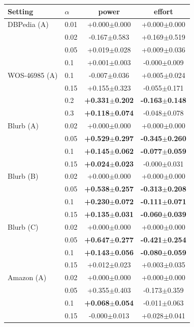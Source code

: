 \begin{tabular}{llcc}
\toprule
Setting & $\alpha$ & power & effort \\
\midrule
DBPedia (A) & 0.01 & +0.000$\pm$0.000 & +0.000$\pm$0.000 \\
 & 0.02 & -0.167$\pm$0.583 & +0.169$\pm$0.519 \\
 & 0.05 & +0.019$\pm$0.028 & +0.009$\pm$0.036 \\
 & 0.1 & +0.001$\pm$0.003 & -0.000$\pm$0.009 \\
\addlinespace
WOS-46985 (A) & 0.1 & -0.007$\pm$0.036 & +0.005$\pm$0.024 \\
 & 0.15 & +0.155$\pm$0.323 & -0.055$\pm$0.171 \\
 & 0.2 & \textbf{+0.331$\pm$0.202} & \textbf{-0.163$\pm$0.148} \\
 & 0.3 & \textbf{+0.118$\pm$0.074} & -0.048$\pm$0.078 \\
\addlinespace
Blurb (A) & 0.02 & +0.000$\pm$0.000 & +0.000$\pm$0.000 \\
 & 0.05 & \textbf{+0.529$\pm$0.297} & \textbf{-0.345$\pm$0.260} \\
 & 0.1 & \textbf{+0.145$\pm$0.062} & \textbf{-0.077$\pm$0.059} \\
 & 0.15 & \textbf{+0.024$\pm$0.023} & -0.000$\pm$0.031 \\
\addlinespace
Blurb (B) & 0.02 & +0.000$\pm$0.000 & +0.000$\pm$0.000 \\
 & 0.05 & \textbf{+0.538$\pm$0.257} & \textbf{-0.313$\pm$0.208} \\
 & 0.1 & \textbf{+0.230$\pm$0.072} & \textbf{-0.111$\pm$0.071} \\
 & 0.15 & \textbf{+0.135$\pm$0.031} & \textbf{-0.060$\pm$0.039} \\
\addlinespace
Blurb (C) & 0.02 & +0.000$\pm$0.000 & +0.000$\pm$0.000 \\
 & 0.05 & \textbf{+0.647$\pm$0.277} & \textbf{-0.421$\pm$0.254} \\
 & 0.1 & \textbf{+0.143$\pm$0.056} & \textbf{-0.080$\pm$0.059} \\
 & 0.15 & +0.012$\pm$0.023 & +0.003$\pm$0.035 \\
\addlinespace
Amazon (A) & 0.02 & +0.000$\pm$0.000 & +0.000$\pm$0.000 \\
 & 0.05 & +0.355$\pm$0.403 & -0.173$\pm$0.359 \\
 & 0.1 & \textbf{+0.068$\pm$0.054} & -0.011$\pm$0.063 \\
 & 0.15 & -0.000$\pm$0.013 & +0.028$\pm$0.041 \\
\bottomrule
\end{tabular}
